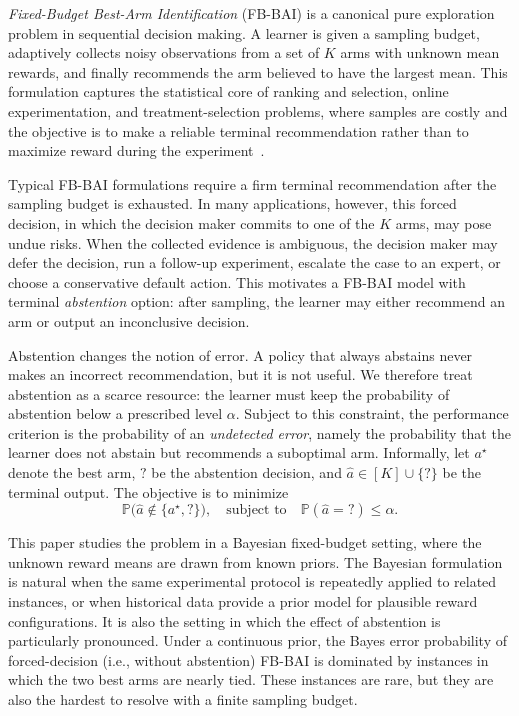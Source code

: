 \documentclass[10pt]{article}
\theoremstyle{plain}
\begin{document}
\emph{Fixed-Budget Best-Arm Identification} (FB-BAI) \citep{audibert2010best,karnin2013almost, carpentier2016tight} is a canonical pure exploration problem in
sequential decision making. A learner is given a  sampling budget, adaptively
collects noisy observations from a set of  $K$ arms with unknown mean rewards, and
 finally   recommends the arm believed to have the largest mean. This formulation
captures the statistical core of ranking and selection, 
online experimentation, and treatment-selection problems, where samples are
costly and the objective is to make a reliable terminal recommendation rather
than to maximize reward during the experiment~\citep{audibert2010best,kaufmann2016complexity,russo2020simple}.

Typical FB-BAI formulations require a firm terminal recommendation after the
sampling budget is exhausted. In many applications, however, this  forced decision, in which the decision maker commits to one of the $K$ arms, may pose undue  risks. When the collected evidence is ambiguous, the decision maker may
defer the decision, run a follow-up experiment, escalate the case to an expert,
or choose a conservative default action. This motivates a FB-BAI model
with terminal {\em abstention} option: after sampling, the learner may either recommend an arm
or output an inconclusive decision.

Abstention changes the notion of error. A policy that always abstains
never makes an incorrect recommendation, but it is not useful. We therefore
treat abstention as a scarce resource: the learner must keep the probability of
abstention below a prescribed level \(\alpha\). Subject to this constraint, the
performance criterion is the probability of an \emph{undetected error}, namely the probability that the learner does not abstain but  recommends a suboptimal arm. Informally, let $a^\star$ denote the best arm, $?$ be the abstention decision, and
$\hat a\in [K]\cup\{?\}$ be the terminal output. The objective is to minimize
\begin{equation}
     \mathbb P\big(\hat a\notin\{a^\star,?\}\big),
     \quad
     \textrm{subject to} \quad \mathbb P(\hat a=?)\le \alpha .
\end{equation}

This paper studies the problem in a Bayesian fixed-budget setting, where the
unknown reward means are drawn from known priors. The Bayesian formulation is
natural when the same experimental protocol is repeatedly applied to related
instances, or when historical data provide a prior model for plausible reward
configurations. It is also the setting in which the effect of abstention is particularly
pronounced. Under a continuous prior, the Bayes error probability of forced-decision (i.e., without abstention) FB-BAI is
dominated by instances in which the two best arms are nearly tied. These instances
are rare, but they are also the hardest to resolve with a finite sampling budget.
\end{document}
